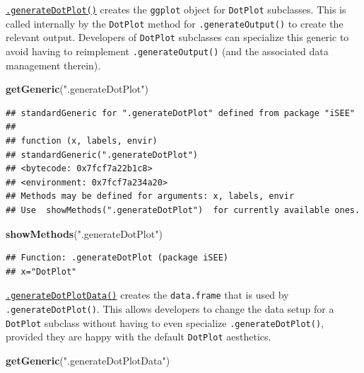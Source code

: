 \documentclass[
]{book}
\newenvironment{Shaded}{\begin{snugshade}}{\end{snugshade}}
\newcommand{\KeywordTok}[1]{\textcolor[rgb]{0.13,0.29,0.53}{\textbf{#1}}}
\newcommand{\NormalTok}[1]{#1}
\newcommand{\StringTok}[1]{\textcolor[rgb]{0.31,0.60,0.02}{#1}}
\begin{document}
\href{https://isee.github.io/iSEE/reference/plot-generics.html}{\texttt{.generateDotPlot()}} creates the \texttt{ggplot} object for \texttt{DotPlot} subclasses.
This is called internally by the \texttt{DotPlot} method for \texttt{.generateOutput()} to create the relevant output.
Developers of \texttt{DotPlot} subclasses can specialize this generic to avoid having to reimplement \texttt{.generateOutput()} (and the associated data management therein).

\begin{Shaded}
\begin{Highlighting}[]
\KeywordTok{getGeneric}\NormalTok{(}\StringTok{".generateDotPlot"}\NormalTok{)}
\end{Highlighting}
\end{Shaded}

\begin{verbatim}
## standardGeneric for ".generateDotPlot" defined from package "iSEE"
## 
## function (x, labels, envir) 
## standardGeneric(".generateDotPlot")
## <bytecode: 0x7fcf7a22b1c8>
## <environment: 0x7fcf7a234a20>
## Methods may be defined for arguments: x, labels, envir
## Use  showMethods(".generateDotPlot")  for currently available ones.
\end{verbatim}

\begin{Shaded}
\begin{Highlighting}[]
\KeywordTok{showMethods}\NormalTok{(}\StringTok{".generateDotPlot"}\NormalTok{)}
\end{Highlighting}
\end{Shaded}

\begin{verbatim}
## Function: .generateDotPlot (package iSEE)
## x="DotPlot"
\end{verbatim}

\href{https://isee.github.io/iSEE/reference/plot-generics.html}{\texttt{.generateDotPlotData()}} creates the \texttt{data.frame} that is used by \texttt{.generateDotPlot()}.
This allows developers to change the data setup for a \texttt{DotPlot} subclass without having to even specialize \texttt{.generateDotPlot()}, provided they are happy with the default \texttt{DotPlot} aesthetics.

\begin{Shaded}
\begin{Highlighting}[]
\KeywordTok{getGeneric}\NormalTok{(}\StringTok{".generateDotPlotData"}\NormalTok{)}
\end{Highlighting}
\end{Shaded}
\end{document}
